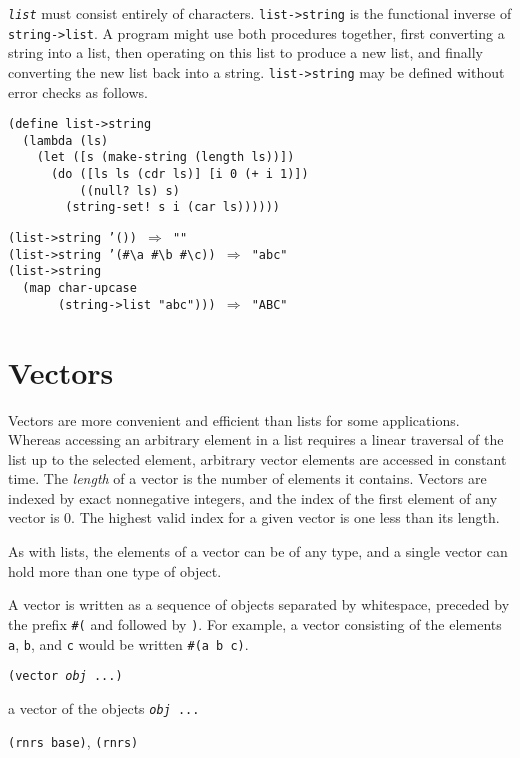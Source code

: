\texttt{\textit{list}} must consist entirely of characters.
\texttt{list-\textgreater{}string} is the functional inverse of \texttt{string-\textgreater{}list}.
A program might use both procedures together, first converting a string
into a list, then operating on this list to produce a new list, and
finally converting the new list back into a string.
\texttt{list-\textgreater{}string} may be defined without error checks as follows.

\begin{alltt}
(define list-\textgreater{}string
  (lambda (ls)
    (let ([s (make-string (length ls))])
      (do ([ls ls (cdr ls)] [i 0 (+ i 1)])
          ((null? ls) s)
        (string-set! s i (car ls))))))

(list-\textgreater{}string '()) \(\Rightarrow\) ""
(list-\textgreater{}string '(\#{}\textbackslash{}a \#{}\textbackslash{}b \#{}\textbackslash{}c)) \(\Rightarrow\) "abc"
(list-\textgreater{}string
  (map char-upcase
       (string-\textgreater{}list "abc"))) \(\Rightarrow\) "ABC"
\end{alltt}

\section{\label{objects_g115}\label{objects_h9}Vectors\label{objects_SECTVECTORS}}



\label{objects_s230}Vectors are more convenient and efficient than lists for
some applications.
Whereas accessing an arbitrary element in a list requires a linear
traversal of the list up to the selected element, arbitrary vector
elements are accessed in constant time.
The \textit{length} of a vector is the number of elements it
contains.
Vectors are indexed by exact nonnegative integers, and the index of the first
element of any vector is 0.
The highest valid index for a given vector is one less than its length.


As with lists, the elements of a vector can be of any type, and
a single vector can hold more than one type of object.


A vector is written as a sequence of objects separated by whitespace,
preceded by the prefix \texttt{\#{}(} and followed by \texttt{)}.
For example, a vector consisting of the elements \texttt{a}, \texttt{b}, and
\texttt{c} would be written \texttt{\#{}(a b c)}.

\begin{description}

\label{objects_s231}\item[procedure] \texttt{(vector \textit{obj} ...)}



\item[returns] a vector of the objects \texttt{\textit{obj} ...}


\item[libraries] \texttt{(rnrs base)}, \texttt{(rnrs)}
\end{description}


